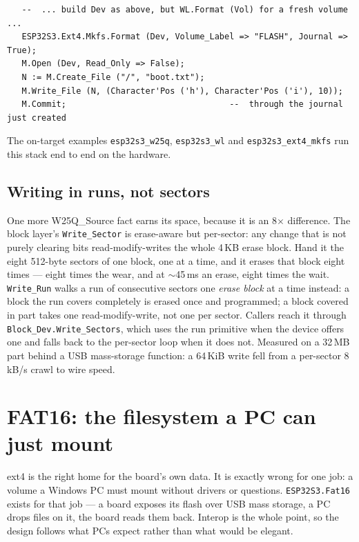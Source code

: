 \begin{lstlisting}
   --  ... build Dev as above, but WL.Format (Vol) for a fresh volume ...
   ESP32S3.Ext4.Mkfs.Format (Dev, Volume_Label => "FLASH", Journal => True);
   M.Open (Dev, Read_Only => False);
   N := M.Create_File ("/", "boot.txt");
   M.Write_File (N, (Character'Pos ('h'), Character'Pos ('i'), 10));
   M.Commit;                                 --  through the journal just created
\end{lstlisting}

\noindent The on-target examples \texttt{esp32s3\_w25q}, \texttt{esp32s3\_wl} and
\texttt{esp32s3\_ext4\_mkfs} run this stack end to end on the hardware.

\subsection{Writing in runs, not sectors}

One more W25Q\_Source fact earns its space, because it is an 8$\times$
difference. The block layer's \texttt{Write\_Sector} is erase-aware but
per-sector: any change that is not purely clearing bits read-modify-writes the
whole 4\,KB erase block. Hand it the eight 512-byte sectors of one block, one
at a time, and it erases that block eight times --- eight times the wear, and at
$\sim$45\,ms an erase, eight times the wait. \texttt{Write\_Run} walks a run
of consecutive sectors one \emph{erase block} at a time instead: a block the
run covers completely is erased once and programmed; a block covered in part
takes one read-modify-write, not one per sector. Callers reach it through
\texttt{Block\_Dev.Write\_Sectors}, which uses the run primitive when the
device offers one and falls back to the per-sector loop when it does not.
Measured on a 32\,MB part behind a USB mass-storage function: a 64\,KiB
write fell from a per-sector 8\,kB/s crawl to wire speed.

\section{FAT16: the filesystem a PC can just mount}

ext4 is the right home for the board's own data. It is exactly wrong for one
job: a volume a Windows PC must mount without drivers or questions.
\texttt{ESP32S3.Fat16} exists for that job --- a board exposes its flash over
USB mass storage, a PC drops files on it, the board reads them back. Interop
is the whole point, so the design follows what PCs expect rather than what
would be elegant.


